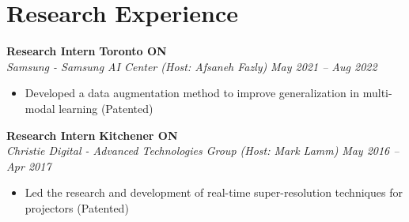 \section*{Research Experience}
    \vspace{\postsubhead}
      \vspace{\interlist}
      \textbf{Research Intern}
      \hfill
      \textbf{Toronto ON}\\
      \textit{Samsung - Samsung AI Center (Host: Afsaneh Fazly)}
      \hfill
      \textit{May 2021 -- Aug 2022}
      \begin{itemize}
        \setlength\itemsep{0.2em}
        \item Developed a data augmentation method to improve generalization in multi-modal learning (Patented)
      \end{itemize}
      \vspace{\interlist}
      \textbf{Research Intern}
      \hfill
      \textbf{Kitchener ON}\\
      \textit{Christie Digital - Advanced Technologies Group (Host: Mark Lamm)}
      \hfill
      \textit{May 2016 -- Apr 2017}
      \begin{itemize}
        \setlength\itemsep{0.2em}
        \item Led the research and development of real-time super-resolution techniques for projectors (Patented)
      \end{itemize}
